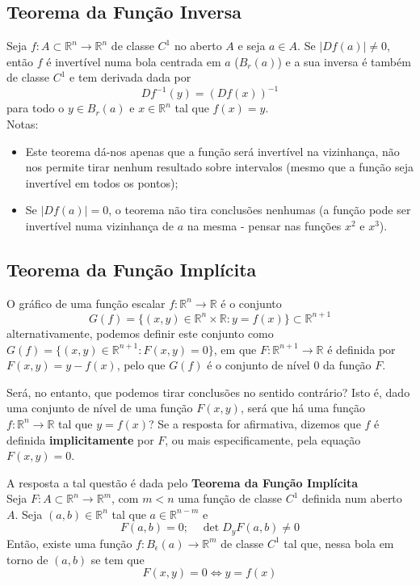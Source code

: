 \documentclass{article}
\newcommand{\R}{\mathbb{R}}
\begin{document}
\subsection{Teorema da Função Inversa}
Seja $f:A \subset \R^n \to \R^n$ de classe $C^1$ no aberto $A$ e seja $a \in A$. Se $|Df(a)| \neq 0$, então $f$ é invertível numa bola centrada em $a$ ($B_r(a)$) e a sua inversa é também de classe $C^1$ e tem derivada dada por
$$
Df^{-1}(y) = \left( Df(x) \right)^{-1}
$$
para todo o $y \in B_r(a)$ e $x \in \R^n$ tal que $f(x) = y$.\\
Notas:
\begin{itemize}
    \item Este teorema dá-nos apenas que a função será invertível na vizinhança, não nos permite tirar nenhum resultado sobre intervalos (mesmo que a função seja invertível em todos os pontos);
    \item Se $|Df(a)|=0$, o teorema não tira conclusões nenhumas (a função pode ser invertível numa vizinhança de $a$ na mesma - pensar nas funções $x^2$ e $x^3$).
\end{itemize}

\subsection{Teorema da Função Implícita}
O gráfico de uma função escalar $f: \R^n \to \R$ é o conjunto
$$ G(f) = \{(x,y) \in \R^n \times \R: y = f(x) \} \subset \R^{n+1} $$
alternativamente, podemos definir este conjunto como $G(f) = \{(x,y) \in \R^{n+1}: F(x,y) = 0 \}$, em que $F: \R^{n+1} \to \R$ é definida por $F(x,y) = y - f(x)$, pelo que $G(f)$ é o conjunto de nível 0 da função $F$.

Será, no entanto, que podemos tirar conclusões no sentido contrário? Isto é, dado uma conjunto de nível de uma função $F(x,y)$, será que há uma função $f: \R^n \to \R$ tal que $y = f(x)$? Se a resposta for afirmativa, dizemos que $f$ é definida \textbf{implicitamente} por $F$, ou mais especificamente, pela equação $F(x,y) = 0$.

A resposta a tal questão é dada pelo \textbf{Teorema da Função Implícita}\\
Seja $F: A \subset \R^n \to \R^m$, com $m<n$ uma função de classe $C^1$ definida num aberto $A$. Seja $(a,b) \in \R^n$ tal que $a \in \R^{n-m}$ e 
$$
F(a,b) = 0; \quad \det D_yF(a,b) \neq 0
$$
Então, existe uma função $f: B_\epsilon(a) \to \R^m$ de classe $C^1$ tal que, nessa bola em torno de $(a,b)$ se tem que 
$$
F(x,y) = 0 \Leftrightarrow y = f(x)
$$
\end{document}
